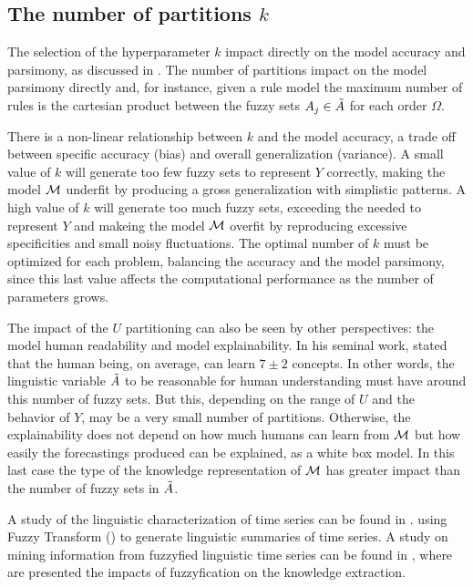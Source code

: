 %
\subsection{The number of partitions $k$}
\label{sec:fts_partitions}

The selection of the hyperparameter $k$ impact directly on the model accuracy and parsimony, as discussed in \cite{Duru2012}. The number of partitions impact on the model parsimony directly and, for instance, given a rule model the maximum number of rules is the cartesian product between the fuzzy sets $A_j \in \tilde{A}$ for each order $\Omega$. 

There is a non-linear relationship between $k$ and the model accuracy, a trade off between specific accuracy (bias) and overall generalization (variance). A small value of $k$ will generate too few fuzzy sets to represent $Y$ correctly, making the model $\mathcal{M}$ underfit by producing a gross generalization with simplistic patterns. A high value of $k$ will generate too much fuzzy sets, exceeding the needed to represent $Y$ and makeing the model $\mathcal{M}$ overfit by reproducing excessive specificities and small noisy fluctuations. The optimal number of $k$ must be optimized for each problem, balancing the accuracy and the model parsimony, since this last value affects the computational performance as the number of parameters grows.

The impact of the $U$ partitioning can also be seen by other perspectives: the model human readability and model explainability. In his seminal work, \cite{Miller1956} stated that the human being, on average, can learn $7 \pm 2$ concepts. In other words, the linguistic variable $\tilde{A}$ to be reasonable for human understanding must have around this number of fuzzy sets. But this, depending on the range of $U$ and the behavior of $Y$, may be a very small number of partitions. Otherwise, the explainability does not depend on how much humans can learn from $\mathcal{M}$ but how easily the forecastings produced can be explained, as a white box model. In this last case the type of the knowledge representation of $\mathcal{M}$ has greater impact than the number of fuzzy sets in $\tilde{A}$. 

A study of the linguistic characterization of time series can be found in \cite{Novak2016}. using Fuzzy Transform (\cite{Perfilieva2006}) to generate linguistic summaries of time series. A study on mining information from fuzzyfied linguistic time series can be found in \cite{Novak2016a}, where are presented the impacts of fuzzyfication on the knowledge extraction.

